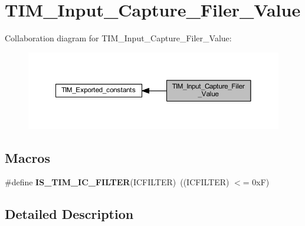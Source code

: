 \hypertarget{group___t_i_m___input___capture___filer___value}{}\section{T\+I\+M\+\_\+\+Input\+\_\+\+Capture\+\_\+\+Filer\+\_\+\+Value}
\label{group___t_i_m___input___capture___filer___value}
Collaboration diagram for T\+I\+M\+\_\+\+Input\+\_\+\+Capture\+\_\+\+Filer\+\_\+\+Value\+:
\nopagebreak
\begin{figure}[H]
\begin{center}
\leavevmode
\includegraphics[width=350pt]{group___t_i_m___input___capture___filer___value}
\end{center}
\end{figure}
\subsection*{Macros}
\begin{DoxyCompactItemize}
\item 
\mbox{\label{group___t_i_m___input___capture___filer___value_ga19ecc5fc2e1ce1697c3dbbb9809ca243}} 
\#define {\bfseries I\+S\+\_\+\+T\+I\+M\+\_\+\+I\+C\+\_\+\+F\+I\+L\+T\+ER}(I\+C\+F\+I\+L\+T\+ER)~((I\+C\+F\+I\+L\+T\+ER) $<$= 0x\+F)
\end{DoxyCompactItemize}


\subsection{Detailed Description}
